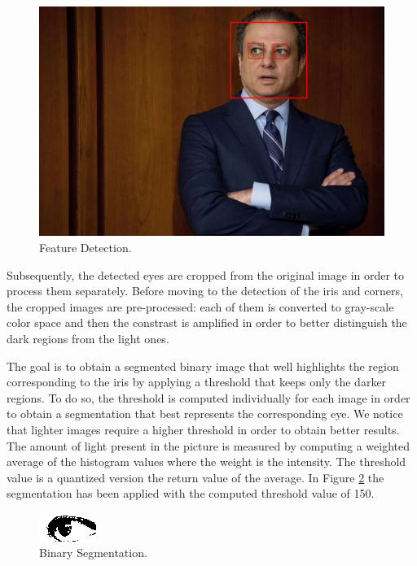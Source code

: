\documentclass[14pt,a4paper]{extreport}
\begin{document}
\begin{figure}[h]
\includegraphics[width=\linewidth, center]{images_T2S/0_features.jpg} 
\caption{Feature Detection.}
\label{fig:feature}
\end{figure}

Subsequently, the detected eyes are cropped from the original image in order to process them separately. Before moving to the detection of the iris and corners, the cropped images are pre-processed: each of them is converted to gray-scale color space and then the constrast is amplified in order to better distinguish the dark regions from the light ones. 

The goal is to obtain a segmented binary image that well highlights the region corresponding to the iris by applying a threshold that keeps only the darker regions. To do so, the threshold is computed individually for each image in order to obtain a segmentation that best represents the corresponding eye. We notice that lighter images require a higher threshold in order to obtain better results. The amount of light present in the picture is measured by computing a weighted average of the histogram values where the weight is the intensity. The threshold value is a quantized version the return value of the average. In Figure \ref{fig:thresh} the segmentation has been applied with the computed threshold value of 150.

\begin{figure}[h]
\includegraphics[width=0.5\linewidth, center]{images_T2S/5_bin_eye0.jpg} 
\caption{Binary Segmentation.}
\label{fig:thresh}
\end{figure}
\end{document}
